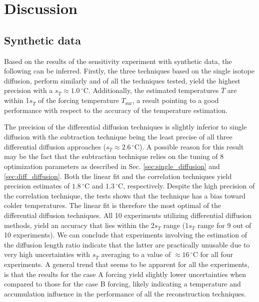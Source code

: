 \documentclass[11pt, draftcls, onecolumn]{IEEEtran} %
\numberwithin{equation}{section}
\numberwithin{table}{section}
\numberwithin{figure}{section}
\begin{document}
\section{Discussion}\label{sec:discussion}

\subsection{Synthetic data}\label{sec:discussion_synthetic}
Based on the results of the sensitivity experiment with 
synthetic data, the following can be inferred. Firstly, the three techniques based on the 
single isotope diffusion, perform similarly and of all the techniques
tested, yield the highest precision with a $s_{\bar{T}} \approx 1.0 \,{}^{\circ} \text{C}$.
Additionally, the estimated temperatures $\overline{T}$ are within 1$s_{\bar{T}}$
of the forcing temperature  $T_{\text{sur}}$, a result pointing to a good performance with respect to 
the accuracy of the temperature estimation. 

The precision of the differential diffusion techniques is slightly
inferior to single diffusion with the subtraction 
technique being the least precise of all three differential diffusion approaches ($s_{\bar{T}} \approx 2.6 \,{}^{\circ} \text{C}$). 
A possible reason for this result may be the fact that the subtraction technique relies on the 
tuning of 8 optimization parameters as described in Sec. \ref{sec:single_diffusion} and 
\ref{sec:diff_diffusion}.
Both the linear fit and the correlation techniques yield precision estimates of $1.8 \,{}^{\circ} \text{C}$ and 
 $1.3 \,{}^{\circ} \text{C}$, respectively.
Despite the high precision of the correlation technique, the tests shows that the technique has a bias toward colder temperatures. 
The linear fit is therefore the most optimal of the differential diffusion techniques.
All 10 experiments utilizing differential diffusion methods, yield an accuracy that lies within the 2$s_{\bar{T}}$ range
(1$s_{\bar{T}}$ range for 9 out of 10 experiments). We can conclude that experiments involving the estimation 
of the diffusion length ratio indicate that the latter are practically unusable due to very high uncertainties
with $s_{\bar{T}}$ averaging to a value of  $\approx 16 \,{}^{\circ} \text{C}$ for all four experiments.
A general trend that seems to be apparent for all the experiments, is that the results for the case A forcing yield
slightly lower uncertainties when compared to those for the case B forcing, likely indicating a
temperature and accumulation influence in the performance of all the reconstruction techniques. 
\end{document}
